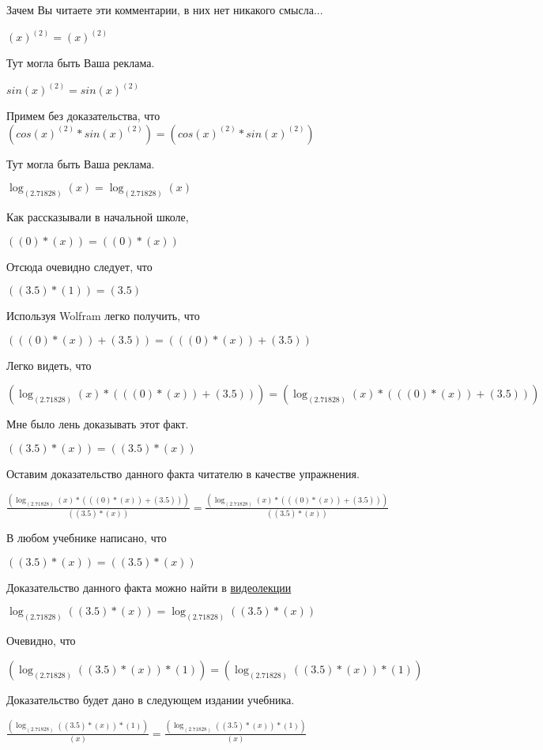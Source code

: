 \documentclass[12pt,a4paper,fleqn]{article}
\theoremstyle{definition}
\begin{document}
Зачем Вы читаете эти комментарии, в них нет никакого смысла...

${( x )}^{( 2 )} = {( x )}^{( 2 )}$

Тут могла быть Ваша реклама.

$sin{( x )}^{( 2 )} = sin{( x )}^{( 2 )}$

Примем без доказательства, что
$(cos{( x )}^{( 2 )} * sin{( x )}^{( 2 )}) = (cos{( x )}^{( 2 )} * sin{( x )}^{( 2 )})$

Тут могла быть Ваша реклама.

$\log_{( 2.71828 )}{( x )} = \log_{( 2.71828 )}{( x )}$

Как рассказывали в начальной школе,

$(( 0 ) * ( x )) = (( 0 ) * ( x ))$

Отсюда очевидно следует, что

$(( 3.5 ) * ( 1 )) = ( 3.5 )$

Используя Wolfram легко получить, что

$((( 0 ) * ( x )) + ( 3.5 )) = ((( 0 ) * ( x )) + ( 3.5 ))$

Легко видеть, что

$(\log_{( 2.71828 )}{( x )} * ((( 0 ) * ( x )) + ( 3.5 ))) = (\log_{( 2.71828 )}{( x )} * ((( 0 ) * ( x )) + ( 3.5 )))$

Мне было лень доказывать этот факт.

$(( 3.5 ) * ( x )) = (( 3.5 ) * ( x ))$

Оставим доказательство данного факта читателю в качестве упражнения.

$\frac{(\log_{( 2.71828 )}{( x )} * ((( 0 ) * ( x )) + ( 3.5 )))}{(( 3.5 ) * ( x ))}
 = \frac{(\log_{( 2.71828 )}{( x )} * ((( 0 ) * ( x )) + ( 3.5 )))}{(( 3.5 ) * ( x ))}
$

В любом учебнике написано, что

$(( 3.5 ) * ( x )) = (( 3.5 ) * ( x ))$

Доказательство данного факта можно найти в \href{https://www.youtube.com/watch?v=dQw4w9WgXcQ}{видеолекции}

$\log_{( 2.71828 )}{(( 3.5 ) * ( x ))} = \log_{( 2.71828 )}{(( 3.5 ) * ( x ))}$

Очевидно, что

$(\log_{( 2.71828 )}{(( 3.5 ) * ( x ))} * ( 1 )) = (\log_{( 2.71828 )}{(( 3.5 ) * ( x ))} * ( 1 ))$

Доказательство будет дано в следующем издании учебника.

$\frac{(\log_{( 2.71828 )}{(( 3.5 ) * ( x ))} * ( 1 ))}{( x )}
 = \frac{(\log_{( 2.71828 )}{(( 3.5 ) * ( x ))} * ( 1 ))}{( x )}
$
\end{document}
